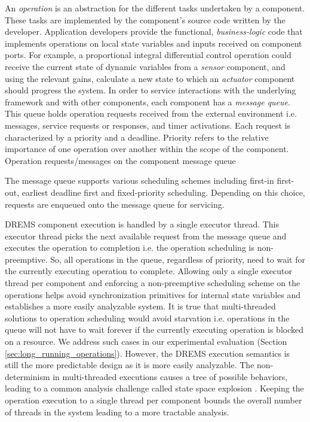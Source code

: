 An \emph{operation} is an abstraction for the different tasks undertaken by a component. These tasks are implemented by the component's source code written by the developer. Application developers provide the functional, \emph{business-logic} code that implements operations on local state variables and inputs received on component ports. For example, a proportional integral differential control operation could receive the current state of dynamic variables from a \emph{sensor} component, and using the relevant gains, calculate a new state to which an \emph{actuator} component should progress the system. In order to service interactions with the underlying framework and with other components, each component has a \emph{message queue}. This queue holds operation requests received from the external environment i.e. messages, service requests or responses, and timer activations. Each request is characterized by a priority and a deadline. Priority refers to the relative importance of one operation over another within the scope of the component. Operation requests/messages on the component message queue 

The message queue supports various scheduling schemes including first-in first-out, earliest deadline first and fixed-priority scheduling. Depending on this choice, requests are enqueued onto the message queue for servicing. 

DREMS component execution is handled by a single executor thread. This executor thread picks the next available request from the message queue and executes the operation to completion i.e. the operation scheduling is non-preemptive. So, all operations in the queue, regardless of priority, need to wait for the currently executing operation to complete. Allowing only a single executor thread per component and enforcing a non-preemptive scheduling scheme on the operations helps avoid synchronization primitives for internal state variables and establishes a more easily analyzable system. It is true that multi-threaded solutions to operation scheduling would avoid starvation i.e. operations in the queue will not have to wait forever if the currently executing operation is blocked on a resource. We address such cases in our experimental evaluation (Section \ref{sec:long_running_operations}). However, the DREMS execution semantics is still the more predictable design as it is more easily analyzable. The non-determinism in multi-threaded executions causes a tree of possible behaviors, leading to a common analysis challenge called state space explosion \cite{lin1987protocol}. Keeping the operation execution to a single thread per component bounds the overall number of threads in the system leading to a more tractable analysis. 

